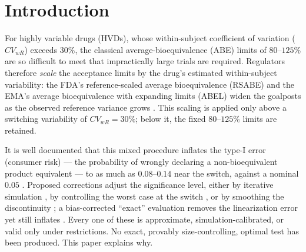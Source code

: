 \documentclass[11pt]{article}
\theoremstyle{remark}
\begin{document}
\section{Introduction}

For highly variable drugs (HVDs), whose within-subject coefficient of variation ($CV_{wR}$) exceeds $30\%$, the classical average-bioequivalence (ABE) limits of $80$--$125\%$ are so difficult to meet that impractically large trials are required. Regulators therefore \emph{scale} the acceptance limits by the drug's estimated within-subject variability: the FDA's reference-scaled average bioequivalence (RSABE) and the EMA's average bioequivalence with expanding limits (ABEL) widen the goalposts as the observed reference variance grows \citep{davit2012, tothfalusi2011}. This scaling is applied only above a switching variability of $CV_{wR}=30\%$; below it, the fixed $80$--$125\%$ limits are retained.

It is well documented that this mixed procedure inflates the type-I error (consumer risk) --- the probability of wrongly declaring a non-bioequivalent product equivalent --- to as much as $0.08$--$0.14$ near the switch, against a nominal $0.05$ \citep{labes2016, wonnemann2015, munoz2016}. Proposed corrections adjust the significance level, either by iterative simulation \citep{labes2016}, by controlling the worst case at the switch \citep{molins2017, ocana2019}, or by smoothing the discontinuity \citep{munoz2024}; a bias-corrected ``exact'' evaluation removes the linearization error yet still inflates \citep{tothfalusi2017}. Every one of these is approximate, simulation-calibrated, or valid only under restrictions. No exact, provably size-controlling, optimal test has been produced. This paper explains why.
\end{document}
